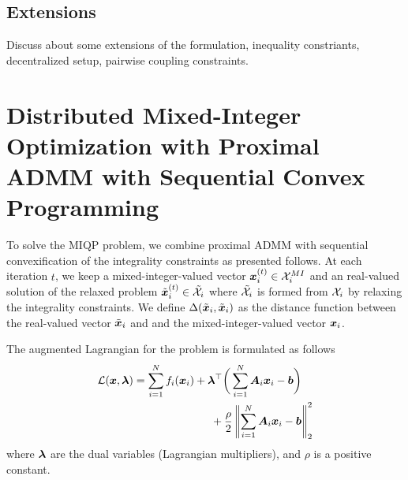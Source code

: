 \documentclass[twocolumn,amsthm]{autart}%
\theoremstyle{definition}
\newtheorem{definition}{Definition}
\theoremstyle{plain}
\begin{document}


\subsection{Extensions}

Discuss about some extensions of the formulation, \eg inequality constriants, decentralized setup, pairwise coupling constraints. 

\section{Distributed Mixed-Integer Optimization with Proximal ADMM with Sequential Convex Programming}

To solve the MIQP problem, we combine proximal ADMM \cite{yang2022proximal} with sequential convexification of the integrality constraints as presented follows.
At each iteration $t$, we keep a mixed-integer-valued vector $\boldsymbol{x}_i^{(t)} \in \mathcal{X}_i^{\relax{MI}}$ and an real-valued solution of the relaxed problem $\tilde{\boldsymbol{x}}_i^{(t)} \in \tilde{\mathcal{X}}_i$ where $\tilde{\mathcal{X}}_i$ is formed from $\mathcal{X}_i$ by relaxing the integrality constraints.
We define $\Delta (\tilde{\boldsymbol{x}}_i, \tilde{\boldsymbol{x}}_i)$ as the distance function between the real-valued vector $\tilde{\boldsymbol{x}}_i$ and and the mixed-integer-valued vector $\boldsymbol{x}_i$.

The augmented Lagrangian for the problem is formulated as follows
\begin{equation}
\begin{multlined}
\LLL (\bbsym{x}, \bbsym{\lambda}) = \sum_{i=1}^{N} f_i ( \bbsym{x}_i) + \bbsym{\lambda}^\top \bigg(\sum_{i=1}^{N} \bbsym{A}_{i} \bbsym{x}_i - \bbsym{b} \bigg) \\
+ \frac{\rho}{2} \norm{\sum_{i=1}^{N} \bbsym{A}_{i} \bbsym{x}_i - \bbsym{b}}_2^2
\end{multlined}
\end{equation}
where $\boldsymbol{\lambda}$ are the dual variables (Lagrangian multipliers), and $\rho$ is a positive constant.
\end{document}
